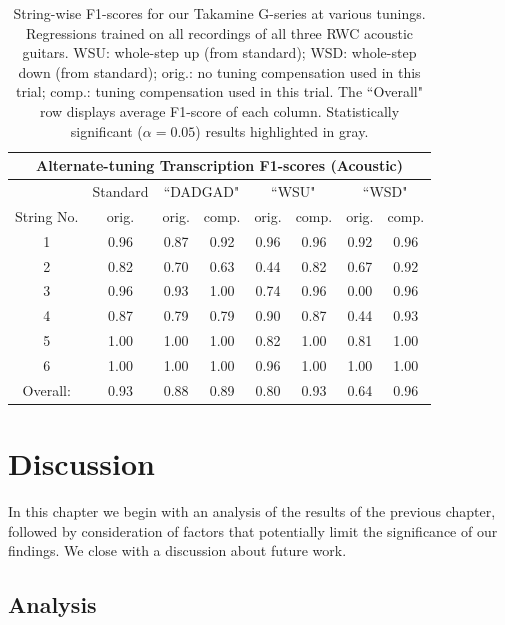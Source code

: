 \documentclass[12pt]{cmuthesis}
\begin{document}
\begin{table}[!htbp]
\begin{center}
\begin{tabular}{||c||c||c|c||c|c||c|c||}
\hline
\multicolumn{8}{|c|}{\bf{Alternate-tuning Transcription F1-scores (Acoustic)}} \\
\hline
& Standard & \multicolumn{2}{|c|}{``DADGAD"} & \multicolumn{2}{|c|}{``WSU"} & \multicolumn{2}{|c|}{``WSD"} \\
\hline
String No. & orig. & orig. & comp. & orig. & comp. & orig. & comp. \\
\hline
1 & 0.96 & 0.87 & 0.92 & 0.96 & 0.96 & 0.92 & 0.96 \\
\hline
2 & 0.82 & 0.70 & 0.63 & 0.44 & 0.82 & 0.67 & 0.92\\
\hline
3 & 0.96 & 0.93 & 1.00 & 0.74 & 0.96 & 0.00 & 0.96\\
\hline
4 & 0.87 & 0.79 & 0.79 & 0.90 & 0.87 & 0.44 & 0.93 \\
\hline
5 & 1.00 & 1.00 & 1.00 & 0.82 & 1.00 & 0.81 & 1.00 \\
\hline
6 & 1.00 & 1.00 & 1.00 & 0.96 & 1.00 & 1.00 & 1.00\\ 
\hline
\hline
Overall: & 0.93 & 0.88 & 0.89 & \cellcolor[gray]{0.8}0.80 & \cellcolor[gray]{0.8}0.93 & \cellcolor[gray]{0.8}0.64 & \cellcolor[gray]{0.8}0.96\\
\hline
\end{tabular}
\caption{String-wise F1-scores for our Takamine G-series at various tunings. Regressions trained on all recordings of all three RWC acoustic guitars. WSU: whole-step up (from standard); WSD: whole-step down (from standard); orig.: no tuning compensation used in this trial; comp.: tuning compensation used in this trial. The ``Overall" row displays average F1-score of each column. Statistically significant ($\alpha=0.05$) results highlighted in gray.} 
\label{tab:results-ag-tune}
\end{center}
\end{table}

\noindent
\chapter{Discussion}
\label{chap:discussion}
In this chapter we begin with an analysis of the results of the previous chapter, followed by consideration of factors that potentially limit the significance of our findings. We close with a discussion about future work.

\section{Analysis}
\end{document}
